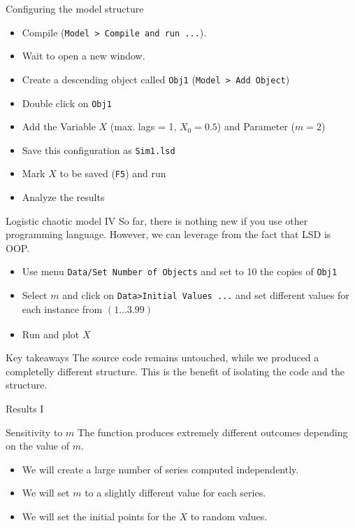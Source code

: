 \documentclass[bigger,aspectratio=169]{beamer}
\begin{document}
\begin{frame}[label={sec:org8bf7b40},fragile]{Configuring the model structure}
 \begin{itemize}
\item Compile (\texttt{Model > Compile and run ...}).
\item Wait to open a new window.
\item Create a descending object called \texttt{Obj1} (\texttt{Model > Add Object})
\item Double click on \texttt{Obj1}
\item Add the Variable \(X\) (max. lags = 1, \(X_{0} = 0.5\)) and Parameter (\(m = 2\))
\item Save this configuration as \texttt{Sim1.lsd}
\item Mark \(X\) to be saved (\texttt{F5}) and run
\item Analyze the results
\end{itemize}
\end{frame}
\begin{frame}[label={sec:org22fbda7},fragile]{Logistic chaotic model IV}
 So far, there is nothing new if you use other programming language.
However, we can leverage from the fact that LSD is OOP.

\begin{itemize}
\item Use menu \texttt{Data/Set Number of Objects} and set to 10 the copies of \texttt{Obj1}
\item Select \(m\) and click on \texttt{Data>Initial Values ...} and set different values for each instance from \((1 \ldots 3.99)_{}\)
\item Run and plot \(X\)
\end{itemize}
\begin{block}{Key takeaways}
The source code remains untouched, while we produced a completelly different structure.
This is the benefit of isolating the code and the structure.
\end{block}
\end{frame}
\begin{frame}[label={sec:org4034540}]{Results I}
\begin{center}

\end{center}
\end{frame}
\begin{frame}[label={sec:orgd469d60}]{Sensitivity to \(m\)}
The function produces \alert{extremely} different outcomes depending on the value of \alert{\(m\)}.

\begin{itemize}
\item We will create a large number of series computed independently.
\item We will set \(m\) to a slightly different value for each series.
\item We will set the \alert{initial} points for the \(X\) to random values.
\end{itemize}
\end{frame}
\end{document}
